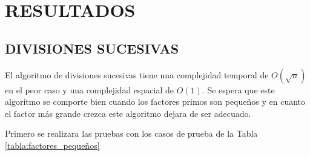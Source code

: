 
\section{RESULTADOS}
    \subsection{DIVISIONES SUCESIVAS}
    El algoritmo de divisiones sucesivas tiene una complejidad temporal de $O(\sqrt{n})$ en el peor caso y una complejidad espacial de $O(1)$. Se espera que este algoritmo se comporte bien cuando los factores primos son pequeños y en cuanto el factor más grande crezca este algoritmo dejara de ser adecuado. 

    Primero se realizara las pruebas con los casos de prueba de la Tabla \ref{tabla:factores_pequeños}
    

